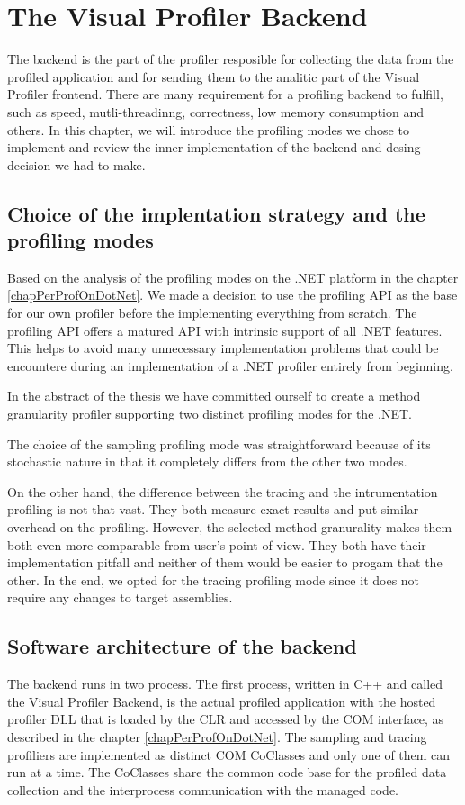 \chapter{The Visual Profiler Backend}
The backend is the part of the profiler resposible for collecting the data from the profiled application and for sending them to the analitic part of the Visual Profiler frontend. There are many requirement for a profiling backend to fulfill, such as speed, mutli-threadinng, correctness, low memory consumption and others. In this chapter, we will introduce the profiling modes we chose to implement and review the inner implementation of the backend and desing decision we had to make.

\section{Choice of the implentation strategy and the profiling modes}
Based on the analysis of the profiling modes on the .NET platform in the chapter \ref{chapPerProfOnDotNet}. We made a decision to use the profiling API as the base for our own profiler before the implementing everything from scratch. The profiling API offers a 	 matured API with intrinsic support of all .NET features. This helps to avoid many unnecessary implementation problems that could be encountere during an implementation of a .NET profiler entirely from beginning.

In the abstract of the thesis we have committed ourself to create a method granularity profiler supporting two distinct profiling modes for the .NET.

The choice of the sampling profiling mode was straightforward because of its stochastic nature in that it completely differs from the other two modes. 

On the other hand, the difference between the tracing and the intrumentation profiling is not that vast. They both measure exact results and put similar overhead on the profiling. However, the selected method granurality makes them both even more comparable from user's point of view. They both have their implementation pitfall and neither of them would be easier to progam that the other. In the end, we opted for the tracing profiling mode since it does not require any changes to target assemblies.

\section{Software architecture of the backend }
The backend runs in two process. The first process, written in C++ and called the Visual Profiler Backend, is the actual profiled application with the hosted profiler DLL that is loaded by the CLR and accessed by the COM interface, as described in the chapter \ref{chapPerProfOnDotNet}. The sampling and tracing profiliers are implemented as distinct COM CoClasses and only one of them can run at a time. The CoClasses share the common code base for the profiled data collection and the interprocess communication with the managed code.

